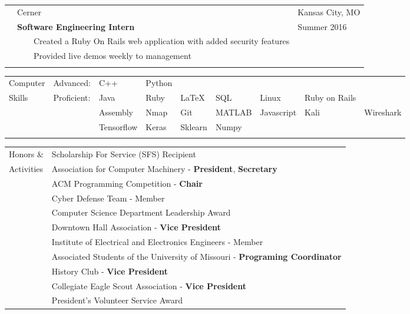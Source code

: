 \documentclass[10.5pt, arial]{article}
\newcommand{\tabitem}{~~\llap{\textbullet}~~}
\begin{document}
\begin{tabular}{p{1.5cm} p{13.2cm} l}
			& Cerner 															& Kansas City, MO 		\\
			& \textbf{Software Engineering Intern} 								& Summer 2016			\\
			& \tabitem Created a Ruby On Rails web application with added security features					& 						\\
			& \tabitem Provided live demos weekly to management 				& 						\\ \\
\end{tabular}

\begin{tabular}{p{1.5cm} l l l l l l l l}
Computer	& Advanced: 	& C++ 		& Python 	& 			& 			& 			& 					\\
Skills		& Proficient:	& Java 		& Ruby 		& \LaTeX 	& SQL 		& Linux   	& Ruby on Rails	& \\
			&			 	& Assembly 	& Nmap 		& Git 		& MATLAB	& Javascript& Kali		& Wireshark	\\ 
			&               & Tensorflow    & Keras     & Sklearn   & Numpy
			\\ \\
\end{tabular}

\begin{tabular}{p{1.5cm} l}
Honors \&	& Scholarship For Service (SFS) Recipient 							\\
Activities	& Association for Computer Machinery - \textbf{President}, \textbf{Secretary}			\\
			& ACM Programming Competition - \textbf{Chair}						\\
			& Cyber Defense Team - Member										\\
			& Computer Science Department Leadership Award 						\\
			& Downtown Hall Association - \textbf{Vice President}				\\
			& Institute of Electrical and Electronics Engineers - Member		\\
			& Associated Students of the University of Missouri - \textbf{Programing Coordinator} 		\\
			& History Club - \textbf{Vice President} 							\\
			& Collegiate Eagle Scout Association - \textbf{Vice President} 		\\
			& President's Volunteer Service Award								\\
\end{tabular}
\end{document}
